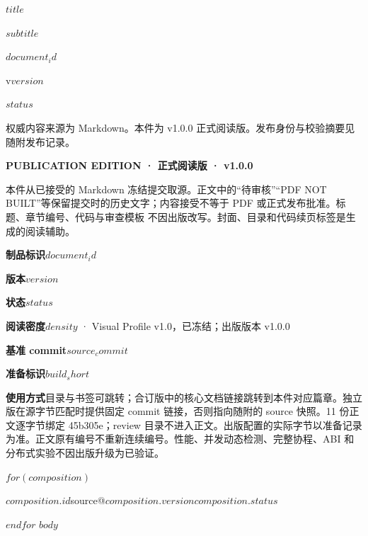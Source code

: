 \documentclass[UTF8,fontset=none,scheme=plain,11pt,a4paper,oneside,openany]{kbbook}
\begin{document}
\pagestyle{empty}
\pagecolor{PreviewNavy}\color{white}
\vspace*{30mm}
\begin{flushleft}{\sffamily\bfseries\fontsize{29}{38}\selectfont $title$\par}\end{flushleft}
\vspace{8mm}
{\sffamily\large $subtitle$\par}
\vfill
{\sffamily\small $document_id$\par\medskip v$version$\par\medskip $status$\par}
\vspace{10mm}
{\small 权威内容来源为 Markdown。本件为 v1.0.0 正式阅读版。发布身份与校验摘要见随附发布记录。\par}
\clearpage\nopagecolor\color{PreviewInk}\pagestyle{fancy}
\noindent\textbf{PUBLICATION EDITION · 正式阅读版 · v1.0.0}

本件从已接受的 Markdown 冻结提交取源。正文中的“待审核”“PDF NOT BUILT”等保留提交时的历史文字；内容接受不等于 PDF 或正式发布批准。标题、章节编号、代码与审查模板 不因出版改写。封面、目录和代码续页标签是生成的阅读辅助。

\medskip
\noindent\textbf{制品标识}\quad $document_id$\par
\noindent\textbf{版本}\quad $version$\par
\noindent\textbf{状态}\quad $status$\par
\noindent\textbf{阅读密度}\quad $density$ · Visual Profile v1.0，已冻结；出版版本 v1.0.0\par
\noindent\textbf{基准 commit}\quad\texttt{$source_commit$}\par
\noindent\textbf{准备标识}\quad\texttt{$build_short$}\par
\noindent\textbf{使用方式}\quad 目录与书签可跳转；合订版中的核心文档链接跳转到本件对应篇章。独立版在源字节匹配时提供固定 commit 链接，否则指向随附的 source 快照。11 份正文逐字节绑定 45b305e；review 目录不进入正文。出版配置的实际字节以准备记录为准。正文原有编号不重新连续编号。性能、并发动态检测、完整协程、ABI 和分布式实验不因出版升级为已验证。

$for(composition)$
\par\noindent\hyperlink{$composition.anchor$}{\textbf{$composition.id$}}\quad source@$composition.version$\quad $composition.status$\par
$endfor$
\clearpage
\setcounter{tocdepth}{$toc_depth$}
\tableofcontents
\clearpage
$body$
\end{document}
